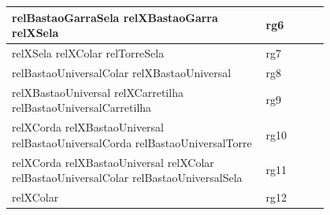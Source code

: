 \documentclass[12pt]{article}
\begin{document}
\begin{table}[H]
\begin{tabular}{|p{0.8\linewidth}|l|}
relBastaoGarraSela relXBastaoGarra relXSela                                                                                                                                                                                                                                                                                                 & rg6         \\ \hline
relXSela relXColar relTorreSela                                                                                                                                                                                                                                                                                                             & rg7         \\ \hline
relBastaoUniversalColar relXBastaoUniversal                                                                                                                                                                                                                                                                                                & rg8         \\ \hline
relXBastaoUniversal relXCarretilha relBastaoUniversalCarretilha                                                                                                                                                                                                                                                                             & rg9         \\ \hline
relXCorda relXBastaoUniversal relBastaoUniversalCorda relBastaoUniversalTorre                                                                                                                                                                                                                                                             & rg10        \\ \hline
relXCorda relXBastaoUniversal relXColar relBastaoUniversalColar relBastaoUniversalSela                                                                                                                                                                                                                                                    & rg11        \\ \hline
relXColar                                                                                                                                                                                                                                                                                                                                 & rg12        \\ \hline

\end{tabular}
\end{table}
\end{document}
